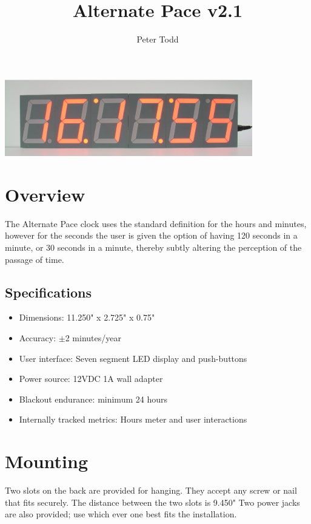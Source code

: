 \documentclass{article}
\title{Alternate Pace v2.1}
\author{Peter Todd}
\date{}
\begin{document}
   \maketitle

\includegraphics[width=4.25in]{figures/front-running-24hr.eps}

\section{Overview}

The Alternate Pace clock uses the standard definition for the hours and
minutes, however for the seconds the user is given the option of having 120
seconds in a minute, or 30 seconds in a minute, thereby subtly altering the
perception of the passage of time.

\subsection{Specifications}

\begin{itemize}
	\item Dimensions: 11.250" x 2.725" x 0.75"
	\item Accuracy: ${\pm}$2 minutes/year
	\item User interface: Seven segment LED display and push-buttons
	\item Power source: 12VDC 1A wall adapter
	\item Blackout endurance: minimum 24 hours
	\item Internally tracked metrics: Hours meter and user interactions
\end{itemize}

\section{Mounting}

Two slots on the back are provided for hanging. They accept any screw or nail
that fits securely. The distance between the two slots is 9.450" Two power
jacks are also provided; use which ever one best fits the installation.
\end{document}
